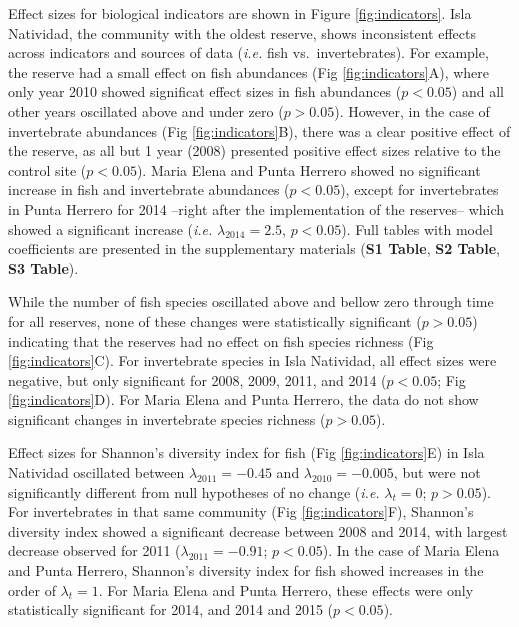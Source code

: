\documentclass{frontiersSCNS}
\theoremstyle{definition}
\theoremstyle{definition}
\theoremstyle{definition}
\theoremstyle{remark}
\begin{document}
Effect sizes for biological indicators are shown in Figure
\ref{fig:indicators}. Isla Natividad, the community with the oldest
reserve, shows inconsistent effects across indicators and sources of
data (\emph{i.e.} fish vs.~invertebrates). For example, the reserve had
a small effect on fish abundances (Fig \ref{fig:indicators}A), where
only year 2010 showed significat effect sizes in fish abundances
(\(p<0.05\)) and all other years oscillated above and under zero
(\(p > 0.05\)). However, in the case of invertebrate abundances (Fig
\ref{fig:indicators}B), there was a clear positive effect of the
reserve, as all but 1 year (2008) presented positive effect sizes
relative to the control site (\(p < 0.05\)). Maria Elena and Punta
Herrero showed no significant increase in fish and invertebrate
abundances (\(p< 0.05\)), except for invertebrates in Punta Herrero for
2014 --right after the implementation of the reserves-- which showed a
significant increase (\emph{i.e.} \(\lambda_{2014} = 2.5\),
\(p < 0.05\)). Full tables with model coefficients are presented in the
supplementary materials (\textbf{S1 Table}, \textbf{S2 Table},
\textbf{S3 Table}).

While the number of fish species oscillated above and bellow zero
through time for all reserves, none of these changes were statistically
significant (\(p > 0.05\)) indicating that the reserves had no effect on
fish species richness (Fig \ref{fig:indicators}C). For invertebrate
species in Isla Natividad, all effect sizes were negative, but only
significant for 2008, 2009, 2011, and 2014 (\(p < 0.05\); Fig
\ref{fig:indicators}D). For Maria Elena and Punta Herrero, the data do
not show significant changes in invertebrate species richness
(\(p > 0.05\)).

Effect sizes for Shannon's diversity index for fish (Fig
\ref{fig:indicators}E) in Isla Natividad oscillated between
\(\lambda_{2011} = -0.45\) and \(\lambda_{2010} = -0.005\), but were not
significantly different from null hypotheses of no change (\emph{i.e.}
\(\lambda_t = 0\); \(p > 0.05\)). For invertebrates in that same
community (Fig \ref{fig:indicators}F), Shannon's diversity index showed
a significant decrease between 2008 and 2014, with largest decrease
observed for 2011 (\(\lambda_{2011} = -0.91\); \(p < 0.05\)). In the
case of Maria Elena and Punta Herrero, Shannon's diversity index for
fish showed increases in the order of \(\lambda_t = 1\). For Maria Elena
and Punta Herrero, these effects were only statistically significant for
2014, and 2014 and 2015 (\(p < 0.05\)).
\end{document}
